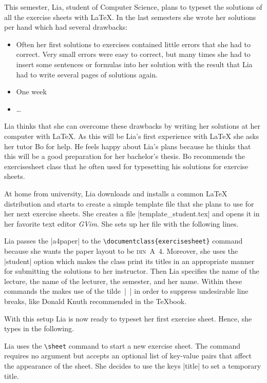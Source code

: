 \documentclass[a4paper,fleqn,9pt]{report}
\def\exercisesheet{{exercisesheet}}
\begin{document}
This semester, Lia, student of Computer Science, plans to typeset the
solutions of all the exercise sheets with \LaTeX{}. In the last
semesters she wrote her solutions per hand which had several
drawbacks:
\begin{itemize}
  \item Often her first solutions to exercises contained little errors
    that she had to correct. Very small errors were easy to correct,
    but many times she had to insert some sentences or formulas into
    her solution with the result that Lia had to write several pages
    of solutions again.
  \item One week 
  \item \ldots
\end{itemize}
Lia thinks that she can overcome these drawbacks by writing her
solutions at her computer with \LaTeX. As this will be Lia's first
experience with \LaTeX{} she asks her tutor Bo for help. He feels
happy about Lia's plans because he thinks that this will be a good
preparation for her bachelor's thesis. Bo recommends the
\exercisesheet{} class that he often used for typesetting his
solutions for exercise sheets.

At home from university, Lia downloads and installs a common \LaTeX{}
distribution and starts to create a simple template file that she
plans to use for her next exercise sheets. She creates a file 
|template_student.tex| and opens it in her
favorite text editor \emph{GVim}. She sets up her file with the
following lines.

Lia passes the |a4paper| to the
\lstinline|\documentclass{exercisesheet}| command because she wants
the paper layout to be \textsc{din}~A~4. Moreover, she uses the
|student| option which makes the class print its titles in
an appropriate manner for submitting the solutions to her instructor.
Then Lia specifies the name of the lecture, the name of the lecturer,
the semester, and her name. Within these commands the makes use of the
tilde~|~| in order to suppress undesirable line breaks, like
Donald Knuth recommended in the \TeX{}book.

With this setup Lia is now ready to typeset her first exercise sheet.
Hence, she types in the following.

Lia uses the \lstinline|\sheet| command to start a new exercise sheet.
The command requires no argument but accepts an optional list of
key-value pairs that affect the appearance of the sheet. She decides
to use the keys |title| to set a temporary title.
\end{document}
